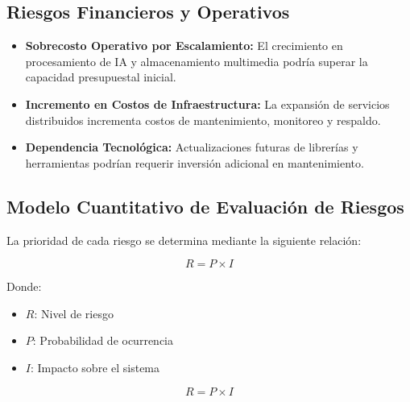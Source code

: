 \documentclass[12pt,oneside,letterpaper]{book}
\begin{document}

\subsection{Riesgos Financieros y Operativos}

\begin{itemize}

\item \textbf{Sobrecosto Operativo por Escalamiento:}
El crecimiento en procesamiento de IA y almacenamiento multimedia podría superar la capacidad presupuestal inicial.

\item \textbf{Incremento en Costos de Infraestructura:}
La expansión de servicios distribuidos incrementa costos de mantenimiento, monitoreo y respaldo.

\item \textbf{Dependencia Tecnológica:}
Actualizaciones futuras de librerías y herramientas podrían requerir inversión adicional en mantenimiento.

\end{itemize}


\subsection{Modelo Cuantitativo de Evaluación de Riesgos}

La prioridad de cada riesgo se determina mediante la siguiente relación:

\[
R = P \times I
\]

Donde:

\begin{itemize}
\item \(R\): Nivel de riesgo
\item \(P\): Probabilidad de ocurrencia
\item \(I\): Impacto sobre el sistema
\end{itemize}

\begin{center}
\[
R = P \times I
\]
\end{center}
\end{document}
